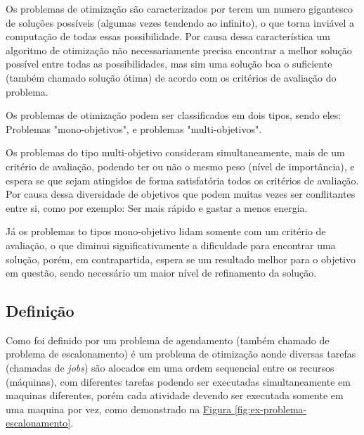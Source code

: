         Os problemas de otimização são caracterizados por terem um numero gigantesco de soluções possíveis (algumas vezes tendendo ao infinito), o que torna inviável a computação de todas essas possibilidade. Por causa dessa característica um algoritmo de otimização não necessariamente precisa encontrar a melhor solução possível entre todas as possibilidades, mas sim uma solução boa o suficiente (também chamado solução ótima) de acordo com os critérios de avaliação do problema.\hfill\vspace{\onelineskip}
        
        \noindent Os problemas de otimização podem ser classificados em dois tipos, sendo eles: Problemas "mono-objetivos", e problemas "multi-objetivos".\hfill\vspace{\onelineskip}
        
        Os problemas do tipo multi-objetivo consideram simultaneamente, mais de um critério de avaliação, podendo ter ou não o mesmo peso (nível de importância), e espera se que sejam atingidos de forma satisfatória todos os critérios de avaliação. Por causa dessa diversidade de objetivos que podem muitas vezes ser conflitantes entre si, como por exemplo: Ser mais rápido e gastar a menos energia.\hfill\vspace{\onelineskip}\vspace{\onelineskip}
        
        Já os problemas to tipos mono-objetivo lidam somente com um critério de avaliação, o que diminui significativamente a dificuldade para encontrar uma solução, porém, em contrapartida, espera se um resultado melhor para o objetivo em questão, sendo necessário um maior nível de refinamento da solução.

    \subsection{Definição}
        Como foi definido por \cite{Bagchi1999} um problema de agendamento (também chamado de problema de escalonamento) é um problema de otimização aonde 
        diversas tarefas (chamadas de \textit{jobs}) são alocados em uma ordem sequencial entre os recursos (máquinas), 
        com diferentes tarefas podendo ser executadas simultaneamente
        em maquinas diferentes, porém cada atividade devendo ser executada somente em uma maquina por vez, como demonstrado na
        \hyperref[fig:ex-problema-escalonamento]{Figura \ref{fig:ex-problema-escalonamento}}.\hfill\vspace{\onelineskip}
        
